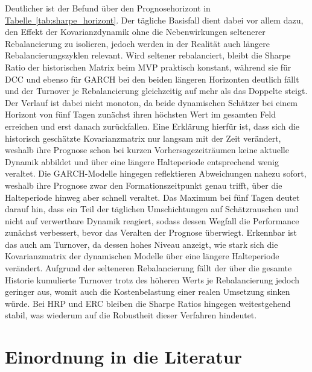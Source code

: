 \documentclass[12pt,a4paper]{article}
\begin{document}
Deutlicher ist der Befund über den Prognosehorizont in \hyperref[tab:sharpe_horizont]{Tabelle~\ref*{tab:sharpe_horizont}}.
Der tägliche Basisfall dient dabei vor allem dazu, den Effekt der Kovarianzdynamik ohne die Nebenwirkungen seltenerer Rebalancierung zu isolieren, jedoch werden in der Realität auch längere Rebalancierungszyklen relevant.
Wird seltener rebalanciert, bleibt die Sharpe Ratio der historischen Matrix beim MVP praktisch konstant, während sie für DCC und ebenso für GARCH bei den beiden längeren Horizonten deutlich fällt und der Turnover je Rebalancierung gleichzeitig auf mehr als das Doppelte steigt.
Der Verlauf ist dabei nicht monoton, da beide dynamischen Schätzer bei einem Horizont von fünf Tagen zunächst ihren höchsten Wert im gesamten Feld erreichen und erst danach zurückfallen.
Eine Erklärung hierfür ist, dass sich die historisch geschätzte Kovarianzmatrix nur langsam mit der Zeit verändert, weshalb ihre Prognose schon bei kurzen Vorhersagezeiträumen keine aktuelle Dynamik abbildet und über eine längere Halteperiode entsprechend wenig veraltet.
Die GARCH-Modelle hingegen reflektieren Abweichungen nahezu sofort, weshalb ihre Prognose zwar den Formationszeitpunkt genau trifft, über die Halteperiode hinweg aber schnell veraltet.
Das Maximum bei fünf Tagen deutet darauf hin, dass ein Teil der täglichen Umschichtungen auf Schätzrauschen und nicht auf verwertbare Dynamik reagiert, sodass dessen Wegfall die Performance zunächst verbessert, bevor das Veralten der Prognose überwiegt.
Erkennbar ist das auch am Turnover, da dessen hohes Niveau anzeigt, wie stark sich die Kovarianzmatrix der dynamischen Modelle über eine längere Halteperiode verändert.
Aufgrund der selteneren Rebalancierung fällt der über die gesamte Historie kumulierte Turnover trotz des höheren Werts je Rebalancierung jedoch geringer aus, womit auch die Kostenbelastung einer realen Umsetzung sinken würde.
Bei HRP und ERC bleiben die Sharpe Ratios hingegen weitestgehend stabil, was wiederum auf die Robustheit dieser Verfahren hindeutet.



\section{Einordnung in die Literatur}\label{sec:literatur}
\iffalse
\end{document}
